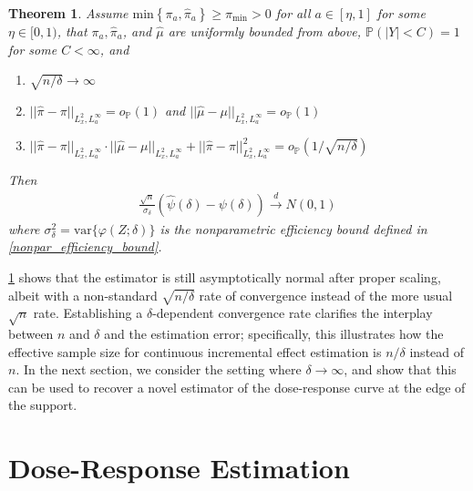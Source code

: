 \documentclass[11pt,twoside]{article}
\newcommand{\var}{\text{var}}
\newtheorem{theorem}{Theorem}
\theoremstyle{definition}
\theoremstyle{remark}
\begin{document}
\begin{theorem} \label{asymptotic_normality}
Assume $\text{min}\left\{ \pi_a, \widehat{\pi}_a \right\} \geq \pi_{\min} >0$ for all $a \in  [\eta, 1]$ for some $\eta \in [0, 1)$,  that $\pi_a, \widehat{\pi}_a$, and $\widehat{\mu}$ are uniformly bounded from above, $\mathbb{P}(|Y| < C) = 1$ for some $C < \infty$, and
\begin{enumerate}
    \item[(i)] $\sqrt{n / \delta} \to \infty$
    \item[(ii)] $ || \widehat{\pi} - \pi||_{L^2_x, L^\infty_a} = o_{\mathbb{P}}(1)$ and  $ || \widehat{\mu} - \mu ||_{L^2_x, L^\infty_a} =  o_{\mathbb{P}}(1)$
    \item[(iii)] $ || \widehat{\pi} - \pi||_{L^2_x, L^\infty_a} \cdot   || \widehat{\mu} - \mu ||_{L^2_x, L^\infty_a}  +  || \widehat{\pi} - \pi||^2_{L^2_x, L^\infty_a} = o_{\mathbb{P}}\left(1 / \sqrt{n / \delta}\right)$
\end{enumerate}
Then 
\begin{align*}
    \frac{\sqrt{n}}{\sigma_\delta}\left(\widehat{\psi}(\delta) - \psi(\delta)\right)\overset{d}{\longrightarrow}N(0,1)
\end{align*}
where $\sigma^2_\delta = \var\{\varphi(Z;\delta)\}$ is the nonparametric efficiency bound defined in \cref{nonpar_efficiency_bound}.
\end{theorem}

\cref{asymptotic_normality} shows that the estimator is still asymptotically  normal after proper scaling, albeit with a non-standard $\sqrt{n/\delta}$ rate of convergence instead of the more usual $\sqrt{n}$ rate. Establishing a $\delta$-dependent convergence rate clarifies the interplay between $n$ and $\delta$ and the estimation error; specifically, this illustrates how the effective sample size for continuous incremental effect estimation is $n/\delta$ instead of $n$. In the next section, we consider the setting where $\delta \to \infty$, and show that this can be used to recover a novel estimator of the dose-response curve at the edge of the support.


\section{Dose-Response Estimation} \label{dose_response_section}
\end{document}
